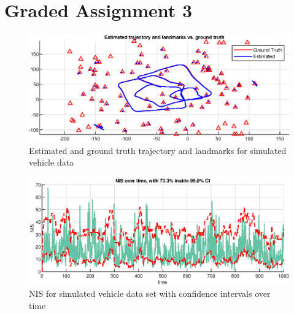 \section{Graded Assignment 3}\label{sec:graded_assignment_3}


\begin{figure}[!htb]
    \centering
    \includegraphics[width=0.8\linewidth]{figures/ga_3/sim_trajectory.eps}
    \caption{Estimated and ground truth trajectory and landmarks for simulated vehicle data}
    \label{fig:ga_3_sim_trajectory}
\end{figure}

\begin{figure}[!htb]
    \centering
    \includegraphics[width=0.8\linewidth]{figures/ga_3/sim_NIS.eps}
    \caption{NIS for simulated vehicle data set with confidence intervals over time}
    \label{fig:ga_3_sim_NIS}
\end{figure}

